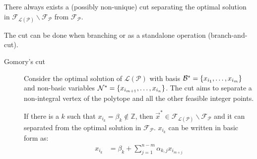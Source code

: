 \begin{descriptionlist}
        \begin{theorem}
            There always exists a (possibly non-unique) cut separating the optimal solution in 
            $\mathcal{F}_{\mathcal{L}(\mathcal{P})} \smallsetminus \mathcal{F}_{\mathcal{P}}$ from 
            $\mathcal{F}_{\mathcal{P}}$.
        \end{theorem}

        \begin{remark}
            The cut can be done when branching or as a standalone operation (branch-and-cut).
        \end{remark}

        \begin{description}
            \item[Gomory's cut] 
                Consider the optimal solution of $\mathcal{L}(\mathcal{P})$ 
                with basis $\mathcal{B}^* = \{ x_{i_1}, \dots, x_{i_m} \}$ and non-basic variables $\mathcal{N}^* = \{ x_{i_{m+1}}, \dots, x_{i_n} \}$.
                The cut aims to separate a non-integral vertex of the polytope and all the other feasible integer points.

                
                If there is a $k$ such that $x_{i_k} = \beta_k \notin \mathbb{Z}$, 
                then $\vec{x}^* \in \mathcal{F}_{\mathcal{L}(\mathcal{P})} \smallsetminus \mathcal{F}_{\mathcal{P}}$
                and it can separated from the optimal solution in $\mathcal{F}_{\mathcal{P}}$.
                $x_{i_k}$ can be written in basic form as:
                \[ 
                    \begin{split}
                        x_{i_k} &= \beta_k + \sum_{j=1}^{n-m} \alpha_{k,j} x_{i_{m+j}} \\
                    \end{split}
                \]


\end{description}
\end{descriptionlist}
